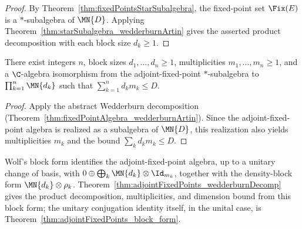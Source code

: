 \begin{proof}
    \leanok
    By Theorem~\ref{thm:fixedPointsStarSubalgebra}, the fixed-point set
    $\Fix(E)$ is a $*$-subalgebra of $\MN{D}$. Applying
    Theorem~\ref{thm:starSubalgebra_wedderburnArtin} gives the asserted
    product decomposition with each block size $d_k\geq1$.
\end{proof}

\begin{theorem}%
    \label{thm:adjointFixedPoints_wedderburnDecomp}
    \leanok
    There exist integers $n$, block sizes $d_1,\ldots,d_n\geq1$,
    multiplicities $m_1,\ldots,m_n\geq1$, and a $\C$-algebra isomorphism
    from the adjoint-fixed-point $*$-subalgebra to
    $\prod_{k=1}^{n}\MN{d_k}$ such that
    $\sum_{k=1}^{n}d_km_k\leq D$.
\end{theorem}

\begin{proof}
    \leanok
    Apply the abstract Wedderburn decomposition
    (Theorem~\ref{thm:fixedPointAlgebra_wedderburnArtin}). Since the
    adjoint-fixed-point algebra is realized as a subalgebra of $\MN{D}$,
    this realization also yields multiplicities $m_k$ and the bound
    $\sum_kd_km_k\leq D$.
\end{proof}

\begin{remark}
    Wolf's block form identifies the adjoint-fixed-point algebra, up to a
    unitary change of basis, with
    $0\oplus\bigoplus_k\MN{d_k}\otimes\Id_{m_k}$, together with the
    density-block form $\MN{d_k}\otimes\rho_k$.
    Theorem~\ref{thm:adjointFixedPoints_wedderburnDecomp} gives the product
    decomposition, multiplicities, and dimension bound from this block
    form; the unitary conjugation identity itself, in the unital case, is
    Theorem~\ref{thm:adjointFixedPoints_block_form}.
\end{remark}

